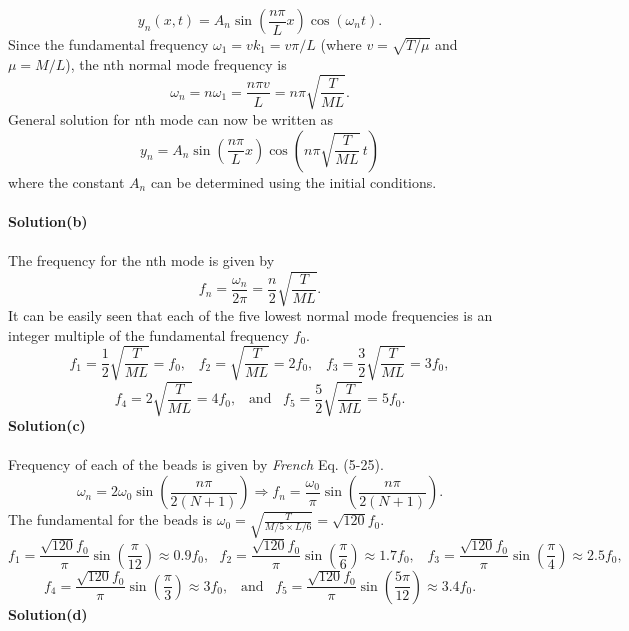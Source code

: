 \documentclass[12pt,a4paper]{article}
\begin{document}
\[y_n(x,t)=A_n\sin\left(\frac{n\pi}{L}x\right)\cos(\omega_nt).\]
Since the fundamental frequency $\omega_1=vk_1=v\pi/L$ (where $v=\sqrt{T/\mu}$ and $\mu=M/L$), the nth normal mode frequency is
\[\omega_n=n\omega_1=\frac{n\pi v}{L}=n\pi\sqrt{\frac{T}{ML}}.\]
General solution for nth mode can now be written as
\begin{equation}
    y_n=A_n\sin\left(\frac{n\pi}{L}x\right)\cos\left(n\pi \sqrt{\frac{T}{ML}}\,t\right)
\end{equation}
where the constant $A_n$ can be determined using the initial conditions.
\\
\\\textbf{Solution(b)}
\\
\\The frequency for the nth mode is given by
\[f_n=\frac{\omega_n}{2\pi}=\frac{n}{2}\sqrt{\frac{T}{ML}}.\]
It can be easily seen that each of the five lowest normal mode frequencies is an integer multiple of the fundamental frequency $f_0$.
\[f_1=\frac{1}{2}\sqrt{\frac{T}{ML}}=f_0,\,\,\,\,\,f_2=\sqrt{\frac{T}{ML}}=2f_0,\,\,\,\,\,f_3=\frac{3}{2}\sqrt{\frac{T}{ML}}=3f_0,\]
\[f_4=2\sqrt{\frac{T}{ML}}=4f_0,\,\,\,\,\,\text{and}\,\,\,\,\,f_5=\frac{5}{2}\sqrt{\frac{T}{ML}}=5f_0.\]
\textbf{Solution(c)}
\\
\\Frequency of each of the beads is given by \textit{French} Eq. (5-25).
\begin{equation}
    \omega_n=2\omega_0\sin\left(\frac{n\pi}{2(N+1)}\right)\Rightarrow f_n=\frac{\omega_0}{\pi}\sin\left(\frac{n\pi}{2(N+1)}\right).
\end{equation}
The fundamental for the beads is $\omega_0=\sqrt{\frac{T}{M/5\times L/6}}=\sqrt{120}f_0.$
\[f_1=\frac{\sqrt{120}f_0}{\pi}\sin\left(\frac{\pi}{12}\right)\approx0.9f_0,\,\,\,\,f_2=\frac{\sqrt{120}f_0}{\pi}\sin\left(\frac{\pi}{6}\right)\approx1.7f_0,\,\,\,\,\,f_3=\frac{\sqrt{120}f_0}{\pi}\sin\left(\frac{\pi}{4}\right)\approx2.5f_0,\]
\[f_4=\frac{\sqrt{120}f_0}{\pi}\sin\left(\frac{\pi}{3}\right)\approx3f_0,\,\,\,\,\,\text{and}\,\,\,\,\,f_5=\frac{\sqrt{120}f_0}{\pi}\sin\left(\frac{5\pi}{12}\right)\approx3.4f_0.\]
\newpage
\textbf{Solution(d)}
\\
\end{document}
